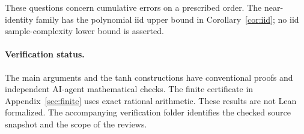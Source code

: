 \documentclass[11pt]{article}
\theoremstyle{remark}\newtheorem{remark}[theorem]{Remark}
\begin{document}
These questions concern cumulative errors on a prescribed order.
The near-identity family has the polynomial iid upper bound in
Corollary~\ref{cor:iid}; no iid sample-complexity lower bound is asserted.

\appendix



\paragraph{Verification status.}
The main arguments and the tanh constructions have conventional proofs
and independent AI-agent mathematical checks. The finite certificate in
Appendix~\ref{sec:finite} uses exact rational arithmetic. These results
are not Lean formalized. The accompanying verification folder identifies
the checked source snapshot and the scope of the reviews.
\end{document}
